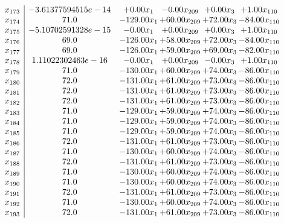 \documentclass[8pt]{article}
\begin{document}
\[\begin{array}{c| c c@{\hskip 2pt} c@{\hskip 2pt} c@{\hskip 2pt} c@{\hskip 2pt} }
 x_{173}   &  -3.61377594515e-14 & +  0.00 x_{1} & -0.00 x_{209} & +  0.00 x_{3} & +  1.00 x_{110}\\
 x_{174}   &  71.0 & -129.00 x_{1} & + 60.00 x_{209} & + 72.00 x_{3} & -84.00 x_{110}\\
 x_{175}   &  -5.10702591328e-15 & -0.00 x_{1} & +  0.00 x_{209} & +  0.00 x_{3} & +  1.00 x_{110}\\
 x_{176}   &  69.0 & -126.00 x_{1} & + 58.00 x_{209} & + 72.00 x_{3} & -84.00 x_{110}\\
 x_{177}   &  69.0 & -126.00 x_{1} & + 59.00 x_{209} & + 69.00 x_{3} & -82.00 x_{110}\\
 x_{178}   &  1.11022302463e-16 & -0.00 x_{1} & +  0.00 x_{209} & -0.00 x_{3} & +  1.00 x_{110}\\
 x_{179}   &  71.0 & -130.00 x_{1} & + 60.00 x_{209} & + 74.00 x_{3} & -86.00 x_{110}\\
 x_{180}   &  72.0 & -131.00 x_{1} & + 61.00 x_{209} & + 73.00 x_{3} & -86.00 x_{110}\\
 x_{181}   &  72.0 & -131.00 x_{1} & + 61.00 x_{209} & + 73.00 x_{3} & -86.00 x_{110}\\
 x_{182}   &  72.0 & -131.00 x_{1} & + 61.00 x_{209} & + 73.00 x_{3} & -86.00 x_{110}\\
 x_{183}   &  71.0 & -129.00 x_{1} & + 59.00 x_{209} & + 74.00 x_{3} & -86.00 x_{110}\\
 x_{184}   &  71.0 & -129.00 x_{1} & + 59.00 x_{209} & + 74.00 x_{3} & -86.00 x_{110}\\
 x_{185}   &  71.0 & -129.00 x_{1} & + 59.00 x_{209} & + 74.00 x_{3} & -86.00 x_{110}\\
 x_{186}   &  72.0 & -131.00 x_{1} & + 61.00 x_{209} & + 73.00 x_{3} & -86.00 x_{110}\\
 x_{187}   &  71.0 & -130.00 x_{1} & + 60.00 x_{209} & + 74.00 x_{3} & -86.00 x_{110}\\
 x_{188}   &  72.0 & -131.00 x_{1} & + 61.00 x_{209} & + 73.00 x_{3} & -86.00 x_{110}\\
 x_{189}   &  71.0 & -130.00 x_{1} & + 60.00 x_{209} & + 74.00 x_{3} & -86.00 x_{110}\\
 x_{190}   &  71.0 & -130.00 x_{1} & + 60.00 x_{209} & + 74.00 x_{3} & -86.00 x_{110}\\
 x_{191}   &  72.0 & -131.00 x_{1} & + 61.00 x_{209} & + 73.00 x_{3} & -86.00 x_{110}\\
 x_{192}   &  71.0 & -130.00 x_{1} & + 60.00 x_{209} & + 74.00 x_{3} & -86.00 x_{110}\\
 x_{193}   &  72.0 & -131.00 x_{1} & + 61.00 x_{209} & + 73.00 x_{3} & -86.00 x_{110}\\

\end{array}\]
\end{document}
